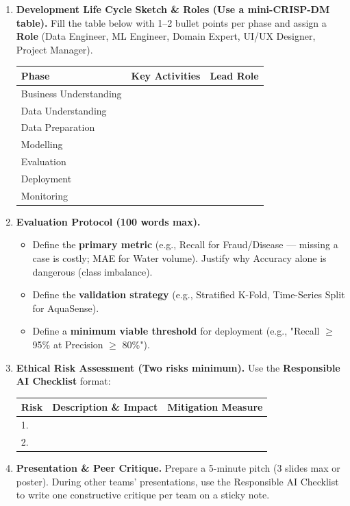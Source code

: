 \documentclass[11pt]{article}
\begin{document}
\begin{enumerate}
    \item \textbf{Development Life Cycle Sketch \& Roles (Use a mini-CRISP-DM table).}
    Fill the table below with 1--2 bullet points per phase and assign a \textbf{Role} (Data Engineer, ML Engineer, Domain Expert, UI/UX Designer, Project Manager).
    \begin{center}
    \begin{tabularx}{\linewidth}{|l|X|l|}
    \hline
    \rowcolor{popblueL}
    \textbf{Phase} & \textbf{Key Activities} & \textbf{Lead Role} \\
    \hline
    Business Understanding &  &  \\
    \hline
    Data Understanding &  &  \\
    \hline
    Data Preparation &  &  \\
    \hline
    Modelling &  &  \\
    \hline
    Evaluation &  &  \\
    \hline
    Deployment &  &  \\
    \hline
    Monitoring &  &  \\
    \hline
    \end{tabularx}
    \end{center}

    \item \textbf{Evaluation Protocol (100 words max).}
    \begin{itemize}
        \item Define the \textbf{primary metric} (e.g., Recall for Fraud/Disease — missing a case is costly; MAE for Water volume). Justify why Accuracy alone is dangerous (class imbalance).
        \item Define the \textbf{validation strategy} (e.g., Stratified K-Fold, Time-Series Split for AquaSense).
        \item Define a \textbf{minimum viable threshold} for deployment (e.g., "Recall $\ge$ 95\% at Precision $\ge$ 80\%").
    \end{itemize}

    \item \textbf{Ethical Risk Assessment (Two risks minimum).}
    Use the \textbf{Responsible AI Checklist} format:
    \begin{center}
    \begin{tabularx}{\linewidth}{|l|X|X|}
    \hline
    \rowcolor{popblueL}
    \textbf{Risk} & \textbf{Description \& Impact} & \textbf{Mitigation Measure} \\
    \hline
    1. &  &  \\
    \hline
    2. &  &  \\
    \hline
    \end{tabularx}
    \end{center}

    \item \textbf{Presentation \& Peer Critique.}
    Prepare a 5-minute pitch (3 slides max or poster). During other teams' presentations, use the Responsible AI Checklist to write one constructive critique per team on a sticky note.
\end{enumerate}
\end{document}
